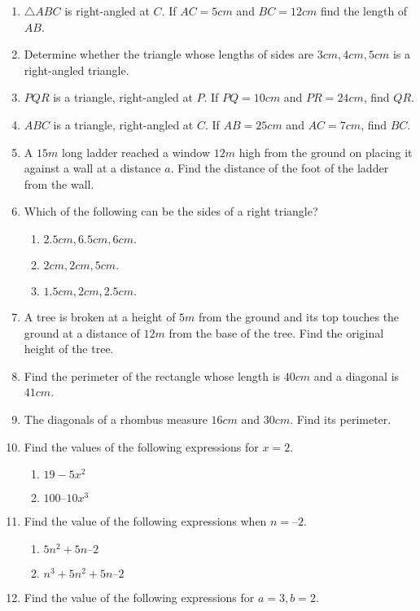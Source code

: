 \begin{enumerate}[label=\thesection.\arabic*, ref=\thesection.\theenumi]
\item $\triangle ABC$ is right-angled at $C$. If $AC = 5 cm$ and $BC = 12 cm$ find the length of $AB$.
	\\
	\solution
	
\item Determine whether the triangle whose lengths of sides are $3 cm, 4 cm, 5 cm$ is a right-angled triangle.
\item $PQR$ is a triangle, right-angled at $P$. If $PQ = 10cm$ and $PR = 24 cm$, find $QR$.
\item $ABC$ is a triangle, right-angled at $C$. If $AB = 25 cm$ and $AC = 7 cm$, find $BC$.
\item A $15 m$ long ladder reached a window $12 m$ high from the ground on placing it against a wall at a distance $a$. Find the distance of the foot of the ladder from the wall.
\item  Which of the following can be the sides of a right triangle? 
\begin{enumerate}
	\item $2.5 cm,6.5 cm, 6 cm.$ 
	\item $ 2 cm, 2 cm, 5 cm.$ 
	\item $ 1.5 cm, 2cm, 2.5 cm.$
\end{enumerate}
\item A tree is broken at a height of $5 m$ from the ground and its top touches the ground at a distance of $12 m$ from the base of the tree. Find the original height of the tree.
\item Find the perimeter of the rectangle whose length is $40 cm$ and a diagonal is $41 cm$. 
\item The diagonals of a rhombus measure $16 cm$ and $30 cm$. Find its perimeter.
\item Find the values of the following expressions for $x = 2$. 
	\begin{enumerate}
\item  $19-5x^2$
\item  $100 – 10x^3$
	\end{enumerate}
\item Find the value of the following expressions when $n = – 2.$ 
	\begin{enumerate}
\item  $5n^2 + 5n – 2 $
\item  $n^3 + 5n^2 + 5n – 2$
	\end{enumerate}
\item Find the value of the following expressions for $a = 3, b = 2$. 

\end{enumerate}
